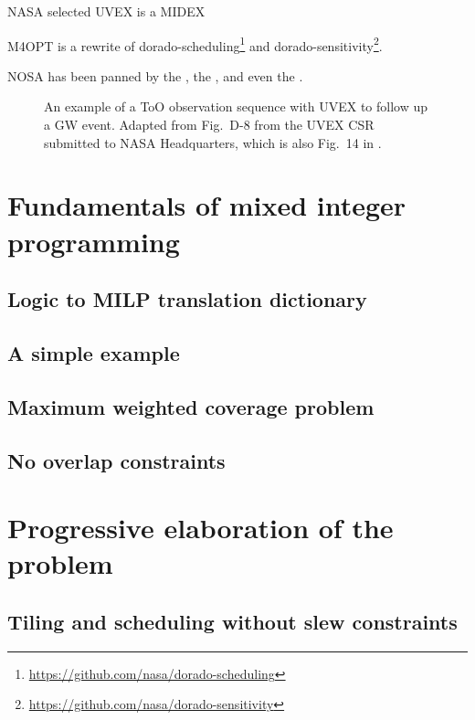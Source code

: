\documentclass[twocolumn,times]{aastex631}
\begin{document}
NASA selected \ac{UVEX} is a \ac{MIDEX}

\ac{M4OPT} is a rewrite of dorado-scheduling\footnote{\url{https://github.com/nasa/dorado-scheduling}} and dorado-sensitivity\footnote{\url{https://github.com/nasa/dorado-sensitivity}}.

\Ac{NOSA} has been panned by the \citet{FSF}, the \citet{NAP25217}, and even the \citet{SMD}.

\begin{figure}
    \caption{\label{eq:fig:uvex-tiling}An example of a \ac{ToO} observation sequence with \ac{UVEX} to follow up a \ac{GW} event. Adapted from Fig.~D-8 from the \ac{UVEX} \ac{CSR} submitted to NASA Headquarters, which is also Fig.~14 in \citet{2021arXiv211115608K}.}
\end{figure}

\section{Fundamentals of mixed integer programming}

\subsection{Logic to MILP translation dictionary}

\subsection{A simple example}

\subsection{Maximum weighted coverage problem}

\subsection{No overlap constraints}

\section{Progressive elaboration of the problem}

\subsection{Tiling and scheduling without slew constraints}
\end{document}

